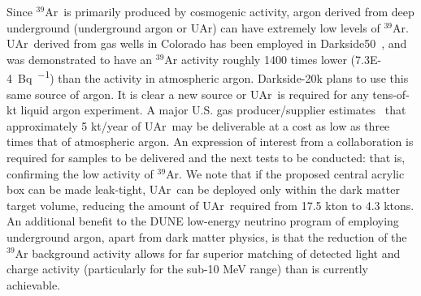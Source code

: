 \documentclass[a4paper,11pt]{article}
\newcommand{\todo}[1]{{\tt \color{red}#1}}
\newcommand{\artn}{$^{39}$Ar}
\newcommand{\uar}{UAr}
\begin{document}
Since \artn~is primarily produced by cosmogenic activity, argon derived from deep underground (underground argon or \uar) can have extremely low levels of \artn. \uar~derived from gas wells in Colorado has been employed in Darkside50~\cite{darkside50}, and was demonstrated to have an $^{39}$Ar activity roughly 1400 times lower (\SI{7.3E-4}{\becquerel\per\kgar}) than the activity in atmospheric argon. Darkside-20k plans to use this same source of argon. It is clear a new source or \uar~is required for any tens-of-kt liquid argon experiment. A major U.S. gas producer/supplier estimates~\cite{privateconv:gaspro} that approximately 5 kt/year of \uar~may be deliverable at a cost as low as three times that of atmospheric argon. An expression of interest from a collaboration is required for samples to be delivered and the next tests to be conducted: that is, confirming the low activity of $^{39}$Ar. We note that if the proposed central acrylic box can be made leak-tight, \uar~can be deployed only within the dark matter target volume, reducing the amount of \uar~required from 17.5 kton to 4.3 ktons. An additional benefit to the DUNE low-energy neutrino program of employing underground argon, apart from dark matter physics, is that the reduction of the $^{39}$Ar background activity allows for far superior matching of detected light and charge activity (particularly for the sub-10 MeV range) than is currently achievable.

\end{document}
